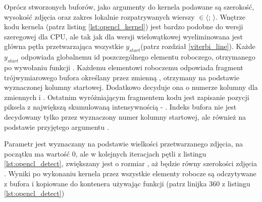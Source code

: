 \documentclass[document.tex]{subfiles}
\begin{document}
 

\indent Oprócz stworzonych buforów, jako argumenty do kernela podawane są szerokość, wysokość zdjęcia oraz 
zakres lokalnie rozpatrywanych wierszy  $\in \langle$;  $\rangle$.
Wnętrze kodu kernela (patrz listing \ref{lst:opencl_kernel}) jest bardzo podobne do wersji szeregowej
dla CPU, ale tak jak dla wersji wielowątkowej wyeliminowana jest główna pętla przetwarzająca wszystkie
$y_{start}$(patrz rozdział \ref{viterbi_line}). Każde $y_{start}$ odpowiada globalnemu id poszczególnego
elementu roboczego, otrzymanego po wywołaniu funkcji .
Każdemu elementowi roboczemu odpowiada fragment trójwymiarowego bufora  określany przez zmienną
, otrzymany na podstawie wyznaczonej kolumny startowej. Dodatkowo decyduje ona
o numerze kolumny dla zmiennych  i . Ostatnim wyróżniającym fragmentem kodu jest zapisanie
pozycji piksela z największą skumulowaną intensywnością - . Indeks bufora  nie jest
decydowany tylko przez wyznaczony numer kolumny startowej, ale również na podstawie przyjętego argumentu
.

 


\indent Parametr  jest wyznaczany na podstawie wielkości przetwarzanego zdjęcia,
na początku ma wartość 0, ale w kolejnych iteracjach pętli z listingu \ref{lst:opencl_detect},
zwiększany jest o rozmiar , aż będzie równy szerokości zdjęcia .
Wyniki po wykonaniu kernela przez wszystkie elementy robocze są odczytywane z bufora  i 
kopiowane do kontenera  używając funkcji (patrz linijka 360 z listingu
\ref{lst:opencl_detect})

 


%
%
\end{document}
